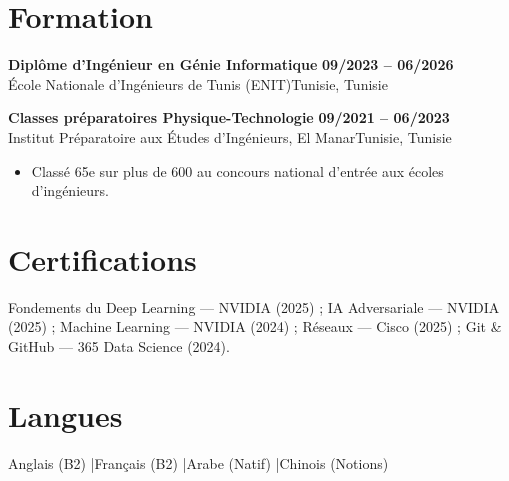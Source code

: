 \documentclass[a4paper,10pt]{article}
\newcommand{\cventry}[4]{%
  \textbf{#1} \hfill \textbf{#4}\\[1pt]
  #2{\ifx\relax#3\relax\else, #3\fi}\par\vspace{2pt}}
\begin{document}
\section{Formation}
\cventry{Diplôme d'Ingénieur en Génie Informatique}{École Nationale d'Ingénieurs de Tunis (ENIT)}{Tunisie}{09/2023 -- 06/2026}
\cventry{Classes préparatoires Physique-Technologie}{Institut Préparatoire aux Études d'Ingénieurs, El Manar}{Tunisie}{09/2021 -- 06/2023}
\begin{itemize}
  \item Classé 65e sur plus de 600 au concours national d'entrée aux écoles d'ingénieurs.
\end{itemize}
\section{Certifications}
Fondements du Deep Learning — NVIDIA (2025) ; IA Adversariale — NVIDIA (2025) ; Machine Learning — NVIDIA (2024) ; Réseaux — Cisco (2025) ; Git \& GitHub — 365 Data Science (2024).
\section{Langues}
Anglais (B2) \quad|\quad Français (B2) \quad|\quad Arabe (Natif) \quad|\quad Chinois (Notions)
\end{document}
